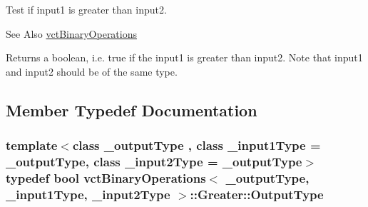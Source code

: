 Test if input1 is greater than input2. 

\begin{DoxySeeAlso}{See Also}
\hyperlink{classvct_binary_operations}{vct\-Binary\-Operations}
\end{DoxySeeAlso}
Returns a boolean, i.\-e. true if the input1 is greater than input2. Note that input1 and input2 should be of the same type. 

\subsection{Member Typedef Documentation}
\hypertarget{classvct_binary_operations_1_1_greater_ac6bbb1b038cdd55bc5fda5b024404ebe}{
\subsubsection[{Output\-Type}]{\setlength{\rightskip}{0pt plus 5cm}template$<$class \-\_\-output\-Type , class \-\_\-input1\-Type  = \-\_\-output\-Type, class \-\_\-input2\-Type  = \-\_\-output\-Type$>$ typedef bool {\bf vct\-Binary\-Operations}$<$ \-\_\-output\-Type, \-\_\-input1\-Type, \-\_\-input2\-Type $>$\-::{\bf Greater\-::\-Output\-Type}}}\label{classvct_binary_operations_1_1_greater_ac6bbb1b038cdd55bc5fda5b024404ebe}


